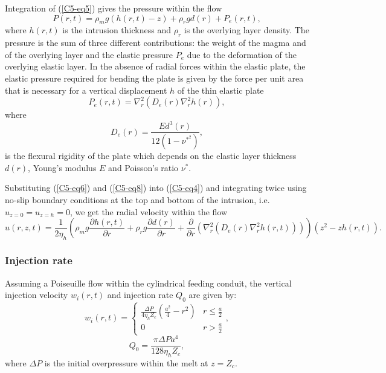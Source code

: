 Integration of (\ref{C5-eq5}) gives the pressure within the flow
\begin{equation}
  P(r,t)=\rho_{m}g(h(r,t)-z) + \rho_rgd(r) + P_{e}(r,t),
  \label{C5-eq6}
\end{equation}
where  $h(r,t)$  is  the  intrusion  thickness  and  $\rho_r$  is  the
overlying layer density.   The pressure is the sum  of three different
contributions: the weight of the magma  and of the overlying layer and
the elastic  pressure $P_e$  due to the  deformation of  the overlying
elastic  layer. In  the absence  of radial  forces within  the elastic
plate, the elastic pressure required for bending the plate is given by
the force per unit area that  is necessary for a vertical displacement
$h$ of the thin elastic plate \citep{Turcotte:1982ca}
\begin{equation}
  P_{e}(r,t)=\nabla^{2}_{r}\left( D_e(r)\nabla^{2}_{r}h(r) \right),
  \label{C5-eq8}	
\end{equation}
where
\begin{equation}
  D_e(r)=\frac{Ed^{3}(r)}{12(1-\nu^*^2)},
  \label{C5-eq8a}
\end{equation}
is the  flexural rigidity of  the plate  which depends on  the elastic
layer thickness  $d(r)$, Young's  modulus $E$ and  Poisson's ratio
$\nu^*$.
	 	
Substituting (\ref{C5-eq6}) and (\ref{C5-eq8}) into (\ref{C5-eq4}) and
integrating twice  using no-slip  boundary conditions  at the  top and
bottom of the  intrusion, i.e. $u_{z=0}=u_{z=h}=0$, we  get the radial
velocity within the flow
\begin{equation}
  u(r,z,t)=        \frac{1}{2\eta_h}\left(\rho_{m}g        \frac{\partial
      h(r,t)}{\partial r} +  \rho_rg \frac{\partial d(r)}{\partial
      r}+\frac{\partial}{\partial                              r}\left
      (         \nabla^{2}_{r}(D_e(r)\nabla^{2}_{r}h(r,t))\right)\right)
  (z^{2}-zh(r,t)).

  \label{C5-eq10}
\end{equation}

\subsubsection{Injection rate}
\label{C5-Injection_Rate}

Assuming a Poiseuille flow within the cylindrical feeding conduit, the
vertical  injection velocity  $w_i(r,t)$  and injection  rate $Q_0$  are
given by:
\begin{equation*}
  w_i(r,t)=
  \begin{cases}
    \frac{ \Delta P}{4 \eta_h Z_{c}} (\frac{a^{2}}{4}-r^{2})& r \le \frac{a}{2}\\
    0 & r > \frac{a}{2}
  \end{cases},
  \label{C5-eq12}
\end{equation*}
\begin{equation}
  Q_{0}=\frac{\pi \Delta P a^{4}}{128 \eta_h Z_c},
  \label{C5-eq11}
\end{equation}
where  $\Delta P$  is  the  initial overpressure  within  the melt  at
$z=Z_{c}$.

